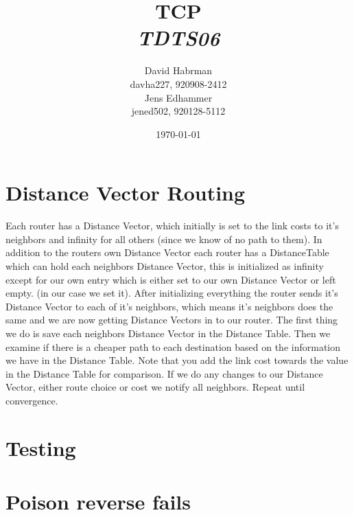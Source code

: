 \documentclass[10pt]{article}
\title{TCP\\
\emph{TDTS06}}
\author{David Habrman \\ davha227, 920908-2412\\
Jens Edhammer \\ jened502, 920128-5112 }
\date{\today}
\begin{document}
\maketitle

\newpage
\tableofcontents
\newpage

\section{Distance Vector Routing}
Each router has a Distance Vector, which initially is set to the link costs to it's neighbors and infinity for all others (since we know of no path to them). In addition to the routers own Distance Vector each router has a DistanceTable which can hold each neighbors Distance Vector, this is initialized as infinity except for our own entry which is either set to our own Distance Vector or left empty. (in our case we set it). After initializing everything the router sends it's Distance Vector to each of it's neighbors, which means it's neighbors does the same and we are now getting Distance Vectors in to our router. The first thing we do is save each neighbors Distance Vector in the Distance Table. Then we examine if there is a cheaper path to each destination based on the information we have in the Distance Table. Note that you add the link cost towards the value in the Distance Table for comparison. If we do any changes to our Distance Vector, either route choice or cost we notify all neighbors. Repeat until convergence. 

\section{Testing}


\section{Poison reverse fails}
\end{document}
